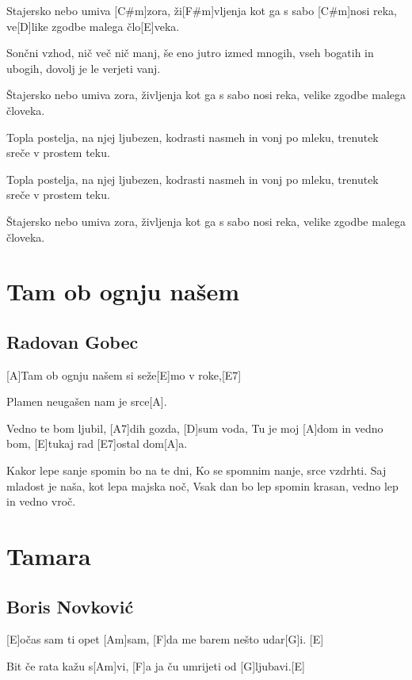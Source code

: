 \documentclass[a4paper,12pt]{article}
\begin{document}
\begin{multicols}{2}
\begin{guitar}
[A]Stajersko nebo umiva [C#m]zora,
ži[F#m]vljenja kot ga s sabo [C#m]nosi reka,
ve[D]like zgodbe malega člo[E]veka.

Sončni vzhod, nič več nič manj,
še eno jutro izmed mnogih,
vseh bogatih in ubogih,
dovolj je le verjeti vanj.

Štajersko nebo umiva zora,
življenja kot ga s sabo nosi reka,
velike zgodbe malega človeka.

Topla postelja, na njej ljubezen,
kodrasti nasmeh in vonj po mleku,
trenutek sreče v prostem teku.

Topla postelja, na njej ljubezen,
kodrasti nasmeh in vonj po mleku,
trenutek sreče v prostem teku.

Štajersko nebo umiva zora,
življenja kot ga s sabo nosi reka,
velike zgodbe malega človeka.

\end{guitar}
\section{Tam ob ognju našem}
\subsection*{Radovan Gobec}
\begin{guitar}

[A]Tam ob ognju našem si seže[E]mo v roke,[E7]
   
Plamen neugašen nam je srce[A]. 

  
Vedno te bom ljubil, 
[A7]dih gozda, [D]sum voda,      
Tu je moj [A]dom in vedno bom, 
[E]tukaj rad [E7]ostal dom[A]a.     


Kakor lepe sanje spomin bo na te dni,
Ko se spomnim nanje, srce vzdrhti.
Saj mladost je naša, kot lepa majska noč,
Vsak dan bo lep spomin krasan, 
vedno lep in vedno vroč.

\end{guitar}
\section{Tamara}
\subsection*{Boris Novković}
\begin{guitar}

[E]očas sam ti opet [Am]sam, 
[F]da me barem nešto udar[G]i. [E]

Bit če rata kažu s[Am]vi, 
[F]a ja ču umrijeti od [G]ljubavi.[E] 




\end{guitar}
\end{multicols}
\end{document}
